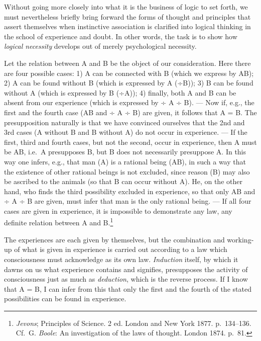 \documentclass[12pt,a4paper]{book}
\newcommand{\opage}[1]{\marginnote{\footnotesize\textit{[#1]}}}
\begin{document}
\opage{214}Without going more closely into what it is the business of
logic to set forth, we must nevertheless briefly bring forward the forms
of thought and principles that assert themselves when instinctive
association is clarified into logical thinking in the school of
experience and doubt. In other words, the task is to show how \emph{logical
necessity} develops out of merely psychological necessity.

Let the relation between A and B be the object of our consideration.
Here there are four possible cases: 1) A can be connected with B (which
we express by AB); 2) A can be found without B (which is expressed by
A (÷B)); 3) B can be found without A (which is expressed by B (÷A));
4) finally, both A and B can be absent from our experience (which is
expressed by ÷ A ÷ B). --- Now if, e.g., the first and the fourth case
(AB and ÷ A ÷ B) are given, it follows that A = B. The presupposition
naturally is that we have convinced ourselves that the 2nd and 3rd cases
(A without B and B without A) do not occur in experience. --- If the
first, third and fourth cases, but not the second, occur in experience,
then A must be AB, i.e.\ A presupposes B, but B does not necessarily
presuppose A. In this way one infers, e.g., that man (A) is a rational
being (AB), in such a way that the existence of other rational beings is
not excluded, since reason (B) may also be ascribed to the animals (so
that B can occur without A). He, on the other hand, who finds the third
possibility excluded in experience, so that only AB and ÷ A ÷ B are
given, must infer that man is the only rational being. --- If all four
cases are given in experience, it is impossible to demonstrate any law,
any definite relation between A and
B.\footnote{\emph{Jevons}; Principles of Science. 2 ed. London and
New York 1877. p.~134--136. Cf.\ G. \emph{Boole}: An investigation of
the laws of thought. London 1874. p.~81.}

The experiences are each given by themselves, but the combination and
working-up of what is given in experience is carried out according to a
law which consciousness must acknowledge as its own law.
\emph{Induction} itself, by which it dawns on us what experience
contains and signifies, presupposes the activity of consciousness just
as much as \emph{deduction}, which is the reverse process.
\opage{215}If I know that A = B, I can infer from this that only the
first and the fourth of the stated possibilities can be found in
experience.
\end{document}
